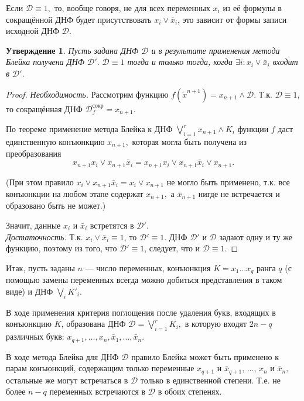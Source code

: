 \documentclass[12pt,a4paper,oneside,fleqn,leqno]{article}
\newtheorem{statement}{Утверждение}
\theoremstyle{definition}
\begin{document}
		Если $\mathcal{D} \equiv 1,$ то, вообще говоря, не для всех переменных $x_i$ из её формулы в сокращённой ДНФ будет присутствовать $x_i \vee \bar{x}_i$, это зависит от формы записи исходной ДНФ $\mathcal{D}.$\par
		\begin{statement}
			Пусть задана ДНФ $\mathcal{D}$ и в результате применения метода Блейка получена ДНФ $\mathcal{D}'.$ $\mathcal{D} \equiv 1$ тогда и только тогда, когда $\exists i: x_i \vee \bar{x}_i$ входит в $\mathcal{D}'.$
		\end{statement}
		\begin{proof}
			\textit{Необходимость.} Рассмотрим функцию $f(\tilde x^{n+1}) = x_{n + 1} \wedge \mathcal{D}.$ Т.к. $\mathcal{D} \equiv 1,$ то сокращённая ДНФ $\mathcal{D}_f^{\text{сокр}} = x_{n + 1}.$\par
			По теореме применение метода Блейка к ДНФ $\bigvee\limits_{i = 1}^r x_{n + 1} \wedge K_i$ функции $f$ даст единственную конъюнкцию $x_{n + 1},$ которая могла быть получена из преобразования
			$$
				x_{n + 1} x_i \vee x_{n + 1} \bar{x}_i = x_{n + 1} x_i \vee x_{n + 1} \bar{x}_i \vee x_{n + 1}.
			$$\par
			(При этом правило $x_i \vee x_{n + 1} \bar{x}_i = x_i \vee x_{n + 1}$ не могло быть применено, т.к. все конъюнкции на любом этапе содержат $x_{n + 1},$ а $\bar{x}_{n + 1}$ нигде не встречается и образовано быть не может.)\par
			Значит, данные $x_i$ и $\bar{x}_i$ встретятся в $\mathcal{D}'.$\\
		\textit{Достаточность.} Т.к. $x_i \vee \bar{x}_i \equiv 1$, то $\mathcal{D}' \equiv 1$. ДНФ $\mathcal{D}'$ и $\mathcal{D}$ задают одну и ту же функцию, поэтому из того, что $\mathcal{D}' \equiv 1$, следует, что и $\mathcal{D} \equiv 1.$
		\end{proof}\par
		Итак, пусть заданы $n$ --- число переменных, конъюнкция $K = x_1\ldots x_q$ ранга $q$ (с помощью замены переменных всегда можно добиться представления в таком виде) и ДНФ $\bigvee\limits_iK'_i.$\par
		В ходе применения критерия поглощения после удаления букв, входящих в конъюнкцию $K$, образована ДНФ $\mathcal{D} = \bigvee\limits_{i = 1}^rK_i,$ в которую входят $2n - q$ различных букв: $x_{q + 1},\ldots, x_n, \bar{x}_1,\ldots,\bar{x}_n$.\par
		В ходе метода Блейка для ДНФ $\mathcal{D}$ правило Блейка может быть применено к парам конъюнкций, содержащим только переменные $x_{q+1}$ и $\bar{x}_{q+1}$, $\ldots$, $x_{n}$ и $\bar{x}_{n},$ остальные же могут встречаться в $\mathcal{D}$ только в единственной степени. Т.е. не более $n - q$ переменных встречаются в $\mathcal{D}$ в обоих степенях.\par
\end{document}
